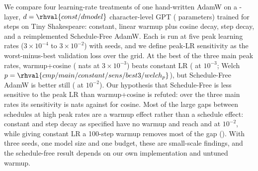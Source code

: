 We compare four learning-rate treatments of one hand-written AdamW on a -layer, $d=\rhval{const/dmodel}$ character-level GPT ( parameters) trained for  steps on Tiny Shakespeare: constant, linear warmup plus cosine decay, step decay, and a reimplemented Schedule-Free AdamW. Each is run at five peak learning rates ($3\times10^{-4}$ to $3\times10^{-2}$) with  seeds, and we define peak-LR sensitivity as the worst-minus-best validation loss over the grid. At the best of the three main peak rates, warmup+cosine ( nats at $3\times10^{-3}$) beats constant LR ( at $10^{-3}$; Welch $p=\rhval{cmp/main/constant/sens/best3/welch_p}$), but Schedule-Free AdamW is better still ( at $10^{-2}$). Our hypothesis that Schedule-Free is less sensitive to the peak LR than warmup+cosine is refuted: over the three main rates its sensitivity is  nats against  for cosine. Most of the large gaps between schedules at high peak rates are a warmup effect rather than a schedule effect: constant and step decay as specified have no warmup and reach  and  at $10^{-2}$, while giving constant LR a 100-step warmup removes most of the gap (). With three seeds, one model size and one budget, these are small-scale findings, and the schedule-free result depends on our own implementation and untuned warmup.
